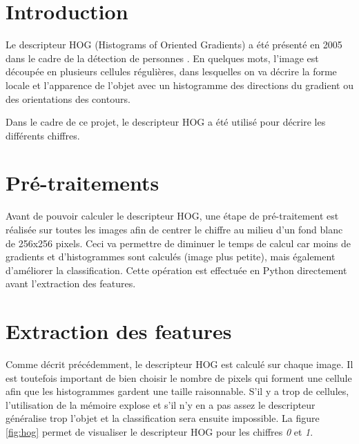 

\section{Introduction}

Le descripteur HOG (Histograms of Oriented Gradients) a été présenté en 2005 dans le cadre de la détection de personnes \cite{NavneetHOG}. En quelques mots, l'image est découpée en plusieurs cellules régulières, dans lesquelles on va décrire la forme locale et l'apparence de l'objet avec un histogramme des directions du gradient ou des orientations des contours.

Dans le cadre de ce projet, le descripteur HOG a été utilisé pour décrire les différents chiffres.

\section{Pré-traitements}
Avant de pouvoir calculer le descripteur HOG, une étape de pré-traitement est réalisée sur toutes les images afin de centrer le chiffre au milieu d'un fond blanc de 256x256 pixels. Ceci va permettre de diminuer le temps de calcul car moins de gradients et d'histogrammes sont calculés (image plus petite), mais également d'améliorer la classification. Cette opération est effectuée en Python directement avant l'extraction des features.

\section{Extraction des features}

Comme décrit précédemment, le descripteur HOG est calculé sur chaque image. Il est toutefois important de bien choisir le nombre de pixels qui forment une cellule afin que les histogrammes gardent une taille raisonnable. S'il y a trop de cellules, l'utilisation de la mémoire explose et s'il n'y en a pas assez le descripteur généralise trop l'objet et la classification sera ensuite impossible. La figure \vref{fig:hog} permet de visualiser le descripteur HOG pour les chiffres \emph{0} et \emph{1}.

